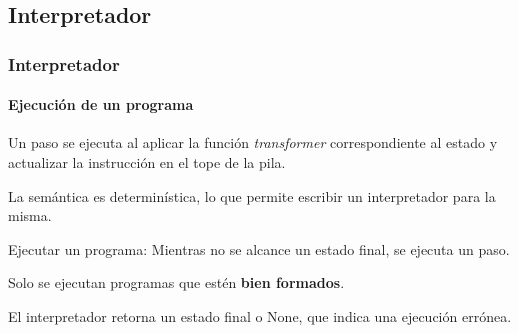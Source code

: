 \subsection{Interpretador}


\begin{frame}
\frametitle{Interpretador}
\framesubtitle{Ejecución de un programa}

Un paso se ejecuta al aplicar la función \textit{transformer} correspondiente al estado y actualizar la instrucción en el tope de la pila.
\bigskip
\pause

La semántica es determinística, lo que permite escribir un interpretador para la misma.
\bigskip
\pause

\begin{block}{Ejecutar un programa:}
Mientras no se alcance un estado final, se ejecuta un paso.
\end{block}

\pause

Solo se ejecutan programas que estén \textbf{bien formados}.

\bigskip

El interpretador retorna un estado final o None, que indica una ejecución errónea.

\end{frame}

